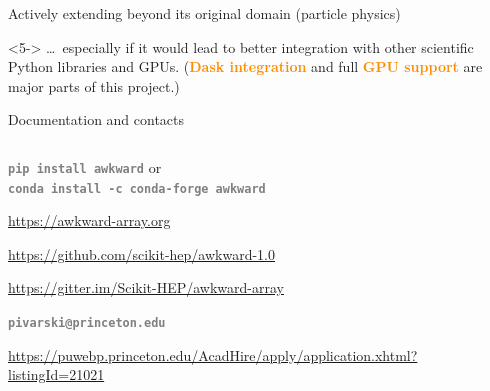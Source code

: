 \documentclass[aspectratio=169]{beamer}
\begin{document}
\begin{frame}{Actively extending beyond its original domain (particle physics)}
\begin{uncoverenv}<5->
\normalsize
\vspace{0.1 cm}
\ldots\ especially if it would lead to better integration with other scientific Python libraries and GPUs. (\textcolor{darkorange}{\bf Dask integration} and full \textcolor{darkorange}{\bf GPU support} are major parts of this project.)
\end{uncoverenv}
\end{frame}

\begin{frame}{Documentation and contacts}
\vspace{0.25 cm}
\Large
\begin{columns}
\begin{description}\setlength{\itemsep}{0.4 cm}
\item[\textcolor{darkorange}{\bf Install:}] \textcolor{gray}{\tt\textbf{pip install awkward}} \mbox{\hspace{0.25 cm}or\hspace{0.25 cm}} \\ \textcolor{gray}{\tt\textbf{conda install -c conda-forge awkward}}
\item[\textcolor{darkorange}{\bf Docs:}] \textcolor{blue}{\url{https://awkward-array.org}}
\item[\textcolor{darkorange}{\bf GitHub:}] \textcolor{blue}{\url{https://github.com/scikit-hep/awkward-1.0}}
\item[\textcolor{darkorange}{\bf Gitter:}] \textcolor{blue}{\url{https://gitter.im/Scikit-HEP/awkward-array}}
\item[\textcolor{darkorange}{\bf Contact:}] \textcolor{gray}{\tt\textbf{pivarski@princeton.edu}}
\item[\textcolor{darkorange}{\bf Postdoc opportunity:}] \small \textcolor{blue}{\url{https://puwebp.princeton.edu/AcadHire/apply/application.xhtml?listingId=21021}}
\end{description}
\end{columns}
\end{frame}
\end{document}

